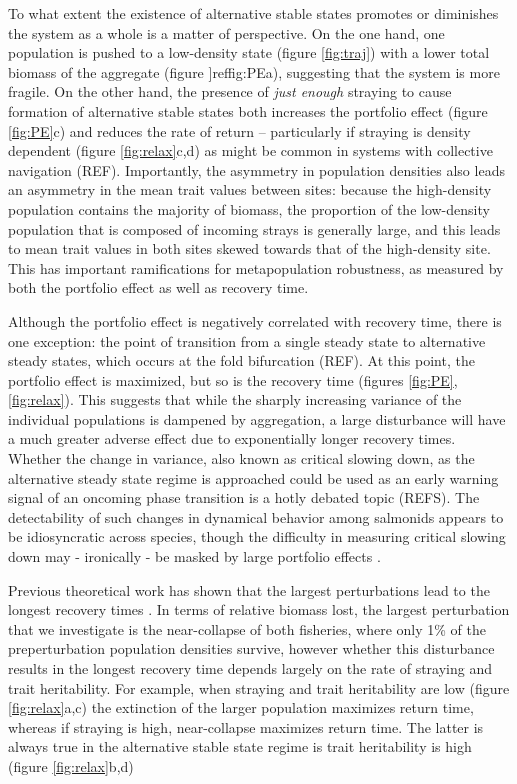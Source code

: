 \documentclass[twocolumn,preprintnumbers,amsmath,amssymb,superscriptaddress]{revtex4}
\begin{document}
To what extent the existence of alternative stable states promotes or diminishes the system as a whole is a matter of perspective.
On the one hand, one population is pushed to a low-density state (figure \ref{fig:traj}) with a lower total biomass of the aggregate (figure ]ref{fig:PE}a), suggesting that the system is more fragile.
On the other hand, the presence of \emph{just enough} straying to cause formation of alternative stable states both increases the portfolio effect (figure \ref{fig:PE}c) and reduces the rate of return -- particularly if straying is density dependent (figure \ref{fig:relax}c,d) as might be common in systems with collective navigation (REF).
Importantly, the asymmetry in population densities also leads an asymmetry in the mean trait values between sites: because the high-density population contains the majority of biomass, the proportion of the low-density population that is composed of incoming strays is generally large, and this leads to mean trait values in both sites skewed towards that of the high-density site.
This has important ramifications for metapopulation robustness, as measured by both the portfolio effect as well as recovery time.


Although the portfolio effect is negatively correlated with recovery time, there is one exception: the point of transition from a single steady state to alternative steady states, which occurs at the fold bifurcation (REF).
At this point, the portfolio effect is maximized, but so is the recovery time (figures \ref{fig:PE}, \ref{fig:relax}).
This suggests that while the sharply increasing variance of the individual populations is dampened by aggregation, a large disturbance will have a much greater adverse effect due to exponentially longer recovery times.
Whether the change in variance, also known as critical slowing down, as the alternative steady state regime is approached could be used as an early warning signal of an oncoming phase transition is a hotly debated topic (REFS).
The detectability of such changes in dynamical behavior among salmonids appears to be idiosyncratic across species, though the difficulty in measuring critical slowing down may - ironically - be masked by large portfolio effects \cite{Krkosek:2014ch}.

Previous theoretical work has shown that the largest perturbations lead to the longest recovery times \cite{Ovaskainen:2002il}.
In terms of relative biomass lost, the largest perturbation that we investigate is the near-collapse of both fisheries, where only 1\% of the preperturbation population densities survive, however whether this disturbance results in the longest recovery time depends largely on the rate of straying and trait heritability.
For example, when straying and trait heritability are low (figure \ref{fig:relax}a,c) the extinction of the larger population maximizes return time, whereas if straying is high, near-collapse maximizes return time.
The latter is always true in the alternative stable state regime is trait heritability is high (figure \ref{fig:relax}b,d)
\end{document}
